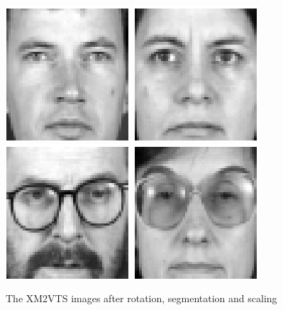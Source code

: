 \begin{figure}[ht]
\begin{center}
\includegraphics[scale=0.12]{ch4/figures/XM2VTS_61.png}
\includegraphics[scale=0.12]{ch4/figures/XM2VTS_62.png}
\includegraphics[scale=0.12]{ch4/figures/XM2VTS_63.png}
\includegraphics[scale=0.12]{ch4/figures/XM2VTS_64.png}\\
\caption{The XM2VTS images after rotation, segmentation and scaling}
\label{fig:XM2VTSface}
\end{center}
\end{figure}

